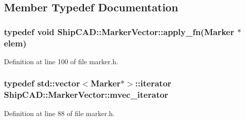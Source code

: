 \subsection{Member Typedef Documentation}
\hypertarget{classShipCAD_1_1MarkerVector_a9b5bd2154a62bceb3e4a0bb648fb297b}{
\subsubsection[{apply\-\_\-fn}]{\setlength{\rightskip}{0pt plus 5cm}typedef void Ship\-C\-A\-D\-::\-Marker\-Vector\-::apply\-\_\-fn({\bf Marker} $\ast$elem)}}\label{classShipCAD_1_1MarkerVector_a9b5bd2154a62bceb3e4a0bb648fb297b}


Definition at line 100 of file marker.\-h.

\hypertarget{classShipCAD_1_1MarkerVector_a15ac0550091a081f0ef20c3f0b03693b}{
\subsubsection[{mvec\-\_\-iterator}]{\setlength{\rightskip}{0pt plus 5cm}typedef std\-::vector$<${\bf Marker}$\ast$$>$\-::iterator {\bf Ship\-C\-A\-D\-::\-Marker\-Vector\-::mvec\-\_\-iterator}}}\label{classShipCAD_1_1MarkerVector_a15ac0550091a081f0ef20c3f0b03693b}


Definition at line 88 of file marker.\-h.



